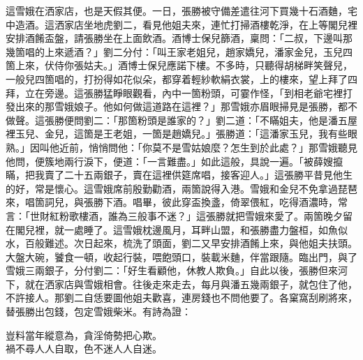 這雪娥在洒家店，也是天假其便。一日，張勝被守備差遣往河下買幾十石酒麯，宅中造酒。這洒家店坐地虎劉二，看見他姐夫來，連忙打掃酒樓乾淨，在上等閣兒裡安排酒餚盃盤，請張勝坐在上面飲酒。酒博士保兒篩酒，稟問：「二叔，下邊叫那幾箇唱的上來遞酒？」劉二分付：「叫王家老姐兒，趙家嬌兒，潘家金兒，玉兒四箇上來，伏侍你張姑夫。」酒博士保兒應諾下樓。不多時，只聽得胡梯畔笑聲兒，一般兒四箇唱的，打扮得如花似朵，都穿着輕紗軟絹衣裳，上的樓來，望上拜了四拜，立在旁邊。這張勝猛睜眼觀看，內中一箇粉頭，可霎作怪，「到相老爺宅裡打發出來的那雪娥娘子。他如何做這道路在這裡？」那雪娥亦眉眼掃見是張勝，都不做聲。這張勝便問劉二：「那箇粉頭是誰家的？」劉二道：「不瞞姐夫，他是潘五屋裡玉兒、金兒，這箇是王老姐，一箇是趙嬌兒。」張勝道：「這潘家玉兒，我有些眼熟。」因叫他近前，悄悄問他：「你莫不是雪姑娘麼？怎生到於此處？」那雪娥聽見他問，便簇地兩行淚下，便道：「一言難盡。」如此這般，具說一遍。「被薛嫂攛瞞，把我賣了二十五兩銀子，賣在這裡供筵席唱，接客迎人。」這張勝平昔見他生的好，常是懷心。這雪娥席前殷勤勸酒，兩箇說得入港。雪娥和金兒不免拿過琵琶來，唱箇詞兒，與張勝下酒。唱畢，彼此穿盃換盞，倚翠偎紅，吃得酒濃時，常言：「世財紅粉歌樓酒，誰為三般事不迷？」這張勝就把雪娥來愛了。兩箇晚夕留在閣兒裡，就一處睡了。這雪娥枕邊風月，耳畔山盟，和張勝盡力盤桓，如魚似水，百般難述。次日起來，梳洗了頭面，劉二又早安排酒餚上來，與他姐夫扶頭。大盤大碗，饕食一頓，收起行裝，喂飽頭口，裝載米麯，伴當跟隨。臨出門，與了雪娥三兩銀子，分付劉二：「好生看顧他，休教人欺負。」自此以後，張勝但來河下，就在洒家店與雪娥相會。往後走來走去，每月與潘五幾兩銀子，就包住了他，不許接人。那劉二自恁要圖他姐夫歡喜，連房錢也不問他要了。各窠窩刮刷將來，替張勝出包錢，包定雪娥柴米。有詩為證：

\begin{myquote}
豈料當年縱意為，貪淫倚勢把心欺。\\禍不尋人人自取，色不迷人人自迷。
\end{myquote}

